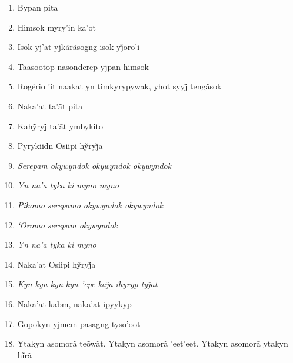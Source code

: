 \begin{enumerate}
 \item Bypan pita

 \item Himsok myry'in ka'ot

 \item Isok yj’at yjkãrãsogng isok yj̃oro’i

 \item Taasootop nasonderep yjpan himsok

 \item Rogério ’it naakat yn timkyrypywak, yhot syyj̃ tengãsok

 \item Naka'at ta'ãt pita

 \begin{center}\end{center}

 \item Kahỹryj̃ ta’ãt ymbykito

 \item Pyrykiidn Osiipi hỹryj̃a

 \item\textit{Serepam okywyndok okywyndok okywyndok}

 \item\textit{Yn na'a tyka ki myno myno}

 \item\textit{Pikomo serepamo okywyndok okywyndok}

 \item\textit{`Oromo serepam okywyndok}

 \item\textit{Yn na'a tyka ki myno}

 \item Naka’at Osiipi hỹryj̃a

 \item\textit{Kyn kyn kyn kyn ’epe kaj̃a ihyryp tyj̃at}

 \item Naka'at kabm, naka'at ipyykyp

 \begin{center}\end{center}

 \item Gopokyn yjmem pasagng tyso'oot

 \item Ytakyn asomorã teõwãt. Ytakyn asomorã ’eet’eet. Ytakyn asomorã ytakyn hĩrã


\end{enumerate}
